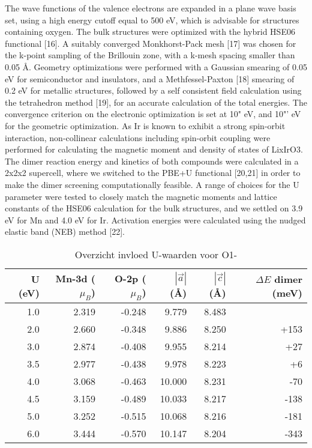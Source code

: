 \begin{refsection}
The wave functions of the valence electrons are expanded in a plane wave basis 
set, using a high energy cutoff equal to 500 eV, which is advisable for 
structures containing oxygen. The bulk structures were optimized with the 
hybrid HSE06 functional [16]. A suitably converged Monkhorst-Pack mesh [17] 
was chosen for the k-point sampling of the Brillouin zone, with a k-mesh 
spacing smaller than 0.05 \AA. Geometry optimizations were performed with a 
Gaussian smearing of 0.05 eV for semiconductor and insulators, and a 
Methfessel-Paxton [18] smearing of 0.2 eV for metallic structures, followed by 
a self consistent field calculation using the tetrahedron method [19], for an 
accurate calculation of the total energies. The convergence criterion on the 
electronic optimization is set at 10" eV, and 10"' eV for the geometric 
optimization. As Ir is known to exhibit a strong spin-orbit interaction, 
non-collinear calculations including spin-orbit coupling were performed for 
calculating the magnetic moment and density of states of LixIrO3. The dimer 
reaction energy and kinetics of both compounds were calculated in a 2x2x2 
supercell, where we switched to the PBE+U functional [20,21] in order to make 
the dimer screening computationally feasible. A range of choices for the U 
parameter were tested to closely match the magnetic moments and lattice 
constants of the HSE06 calculation for the bulk structures, and we settled on 
3.9 eV for Mn and 4.0 eV for Ir. Activation energies were calculated using the 
nudged elastic band (NEB) method [22].  
 
\begin{table}[h] 
\centering 
\caption{Overzicht invloed U-waarden voor O1-} 
  \begin{tabular}{rrrrrr} 
    \toprule 
    U (eV) & Mn-3d ($\mu_B$) & O-2p ($\mu_B$) & $|\vec{a}|$ (\si{\angstrom}) & 
$|\vec{c}|$ (\si{\angstrom}) & $\Delta E$ dimer (meV) \\ 
    \midrule 
    1.0 & 2.319 & -0.248 & 9.779 & 8.483 &  \\  
    2.0 & 2.660 & -0.348 & 9.886 & 8.250 & +153 \\ 
    3.0 & 2.874 & -0.408 & 9.955 & 8.214 & +27 \\  
    3.5 & 2.977 & -0.438 & 9.978 & 8.223 & +6 \\  
    4.0 & 3.068 & -0.463 & 10.000 & 8.231 & -70 \\  
    4.5 & 3.159 & -0.489 & 10.033 & 8.217 & -138 \\  
    5.0 & 3.252 & -0.515 & 10.068 & 8.216 & -181 \\   
    6.0 & 3.444 & -0.570 & 10.147 & 8.204 & -343 \\  
   \bottomrule 
   \end{tabular} 
\end{table} 
 

\end{refsection}

